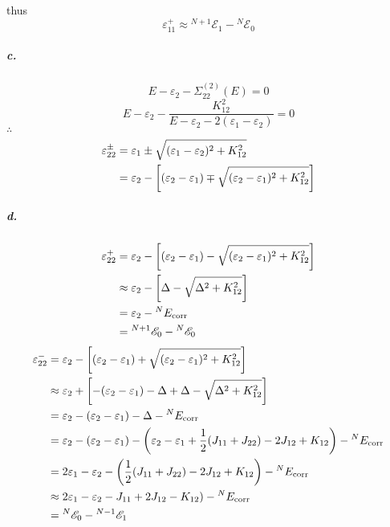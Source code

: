 \documentclass[a4paper]{article}
\DeclareMathOperator{\corr}{\mathrm{corr}}
\newcommand{\subex}[1]{\subparagraph{#1}}
\numberwithin{equation}{subsection}
\begin{document}
thus
\begin{equation}\label{key}
\varepsilon_{11}^+ \approx {^{N+1}}\mathscr{E}_1 - {^N}\mathscr{E}_0
\end{equation}
\subex{c.}
\begin{equation}\label{key}
E - \varepsilon_2 - \Sigma_{22}^{(2)}(E) = 0
\end{equation}
\begin{equation}\label{key}
E - \varepsilon_2 - \dfrac{K_{12}^2}{E - \varepsilon_2 - 2(\varepsilon_1 - \varepsilon_2)} = 0
\end{equation}
$ \therefore $
\begin{align}\label{key}
\varepsilon_{22}^\pm &= \varepsilon_1 \pm \sqrt{(\varepsilon_1 - \varepsilon_2)^2 + K_{12}^2} \notag\\
&= \varepsilon_2 - \qty[(\varepsilon_2 - \varepsilon_1) \mp \sqrt{(\varepsilon_2 - \varepsilon_1)^2 + K_{12}^2}]
\end{align}
\subex{d.}
\begin{align}
\varepsilon_{22}^+ &= \varepsilon_2 - \qty[(\varepsilon_2 - \varepsilon_1) - \sqrt{(\varepsilon_2 - \varepsilon_1)^2 + K_{12}^2}] \notag\\
&\approx \varepsilon_2 - \qty[\Delta - \sqrt{\Delta^2 + K_{12}^2}] \notag\\
&= \varepsilon_2 - {^N}E_{\corr} \notag\\
&= {^{N+1}}\mathscr{E}_0 - {^N}\mathscr{E}_0
\end{align}
\begin{align}
\varepsilon_{22}^- &= \varepsilon_2 - \qty[(\varepsilon_2 - \varepsilon_1) + \sqrt{(\varepsilon_2 - \varepsilon_1)^2 + K_{12}^2}] \notag\\
&\approx \varepsilon_2 + \qty[-(\varepsilon_2 - \varepsilon_1) -\Delta + \Delta - \sqrt{\Delta^2 + K_{12}^2}] \notag\\
&= \varepsilon_2 - (\varepsilon_2 - \varepsilon_1) - \Delta - {^N}E_{\corr} \notag\\
&= \varepsilon_2 - (\varepsilon_2 - \varepsilon_1) - \qty(\varepsilon_2 - \varepsilon_1 + \dfrac{1}{2}(J_{11} + J_{22}) - 2J_{12} + K_{12}) - {^N}E_{\corr} \notag\\
&= 2\varepsilon_1 - \varepsilon_2 - \qty(\dfrac{1}{2}(J_{11} + J_{22}) - 2J_{12} + K_{12}) - {^N}E_{\corr} \notag\\
&\approx 2\varepsilon_1 - \varepsilon_2 - J_{11} + 2J_{12} - K_{12}) - {^N}E_{\corr} \notag\\
&= {^N}\mathscr{E}_0 - {^{N-1}}\mathscr{E}_1
\end{align}
\end{document}
